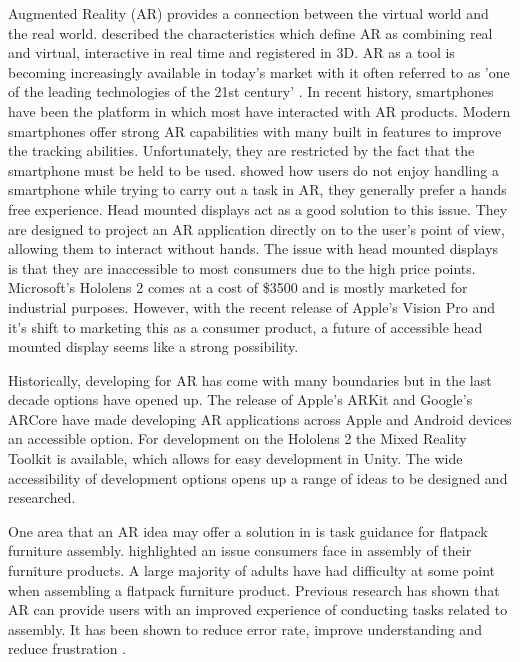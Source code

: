 \documentclass{l4proj}
\begin{document}
Augmented Reality (AR) provides a connection between the virtual world and the real world. \citet{azuma1997survey} described the characteristics which define AR as combining real and virtual, interactive in real time and registered in 3D. AR as a tool is becoming increasingly available in today's market with it often referred to as 'one of the leading technologies of the 21st century' \citep{arena_overview_2022}. In recent history, smartphones have been the platform in which most have interacted with AR products. Modern smartphones offer strong AR capabilities with many built in features to improve the tracking abilities. Unfortunately, they are restricted by the fact that the smartphone must be held to be used. \citet{blattgerste_comparing_2017} showed how users do not enjoy handling a smartphone while trying to carry out a task in AR, they generally prefer a hands free experience. Head mounted displays act as a good solution to this issue. They are designed to project an AR application directly on to the user's point of view, allowing them to interact without hands. The issue with head mounted displays is that they are inaccessible to most consumers due to the high price points. Microsoft's Hololens 2 \citep{microsoft_hololens_2019} comes at a cost of \$3500 and is mostly marketed for industrial purposes. However, with the recent release of Apple's Vision Pro \citep{apple_apple_2024} and it's shift to marketing this as a consumer product, a future of accessible head mounted display seems like a strong possibility.

Historically, developing for AR has come with many boundaries but in the last decade options have opened up. The release of Apple's ARKit \citep{inc_arkit_2017} and Google's ARCore \citep{google_build_2017} have made developing AR applications across Apple and Android devices an accessible option. For development on the Hololens 2 the Mixed Reality Toolkit \citep{polar-kev_mrtk2-unity_2022} is available, which allows for easy development in Unity. The wide accessibility of development options opens up a range of ideas to be designed and researched.

One area that an AR idea may offer a solution in is task guidance for flatpack furniture assembly. \citet{Richardson11} highlighted an issue consumers face in assembly of their furniture products. A large majority of adults have had difficulty at some point when assembling a flatpack furniture product. Previous research has shown that AR can provide users with an improved experience of conducting tasks related to assembly. It has been shown to reduce error rate, improve understanding and reduce frustration \citep{Tang2004, wu_cognitive_2023, yang_comparing_2020}. 
\end{document}
